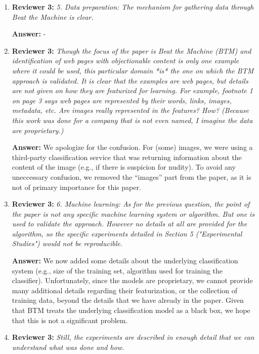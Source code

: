 \documentclass[letterpaper]{article}
\begin{document}
\begin{enumerate}
\item \textbf{Reviewer 3:} \emph{ 5. Data preparation: The mechanism for gathering data through Beat the Machine is clear.}

\textbf{Answer:} -

\item \textbf{Reviewer 3:} \emph{ Though the focus of the paper is Beat the Machine (BTM) and identification of web pages with objectionable content is only one example where it could be used, this particular domain *is* the one on which the BTM approach is validated.  It is clear that the examples are web pages, but details are not given on how they are featurized for learning.  For example, footnote 1 on page 3 says web pages are represented by their words, links, images, metadata, etc.  Are images really represented in the features?  How? (Because this work was done for a company that is not even named, I imagine the data are proprietary.)}

\textbf{Answer:} We apologize for the confusion. For (some) images, we were using a third-party classification service that was returning information about the content of the image (e.g., if there is suspicion for nudity). To avoid any uneccessary confusion, we removed the ``images'' part from the paper, as it is not of primary importance for this paper.

\item \textbf{Reviewer 3:} \emph{ 6. Machine learning: As for the previous question, the point of the paper is not any specific machine learning system or algorithm.  But one is used to validate the approach.  However no details at all are provided for the algorithm, so the specific experiments detailed in Section 5 ("Experimental Studies") would not be reproducible.}

\textbf{Answer:} We now added some details about the underlying classification system (e.g., size of the training set, algorithm used for training the classifier). Unfortunately, since the models are proprietary, we cannot provide many additional details regarding their featurization, or the collection of training data, beyond the details that we have already in the paper. Given that BTM treats the underlying classification model as a black box, we hope that this is not a significant problem. 

\item \textbf{Reviewer 3:} \emph{ Still, the experiments are described in enough detail that we can understand what was done and how.}


\end{enumerate}
\end{document}
